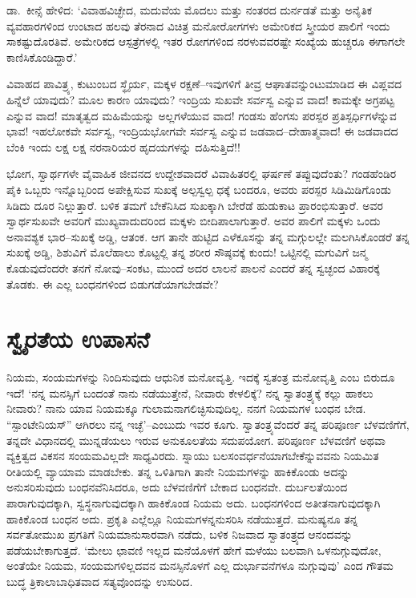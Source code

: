 ಡಾ.\ ಕೀನ್ಸೆ ಹೇಳಿದ: ‘ವಿವಾಹವಿಚ್ಛೇದ, ಮದುವೆಯ ಮೊದಲು ಮತ್ತು ನಂತರದ ದುರ್ನಡತೆ ಮತ್ತು ಅನೈತಿಕ ವ್ಯವಹಾರಗಳಿಂದ ಉಂಟಾದ ಹಲವು ತೆರನಾದ ವಿಚಿತ್ರ ಮನೋರೋಗಗಳು ಅಮೇರಿಕದ ಸ್ತ್ರೀಯರ ಪಾಲಿಗೆ ಇಂದು ಸಾಕಷ್ಟುದೊರತಿವೆ. ಅಮೇರಿಕದ ಆಸ್ಪತ್ರೆಗಳಲ್ಲಿ ಇತರ ರೋಗಗಳಿಂದ ನರಳುವವರಷ್ಟೇ ಸಂಖ್ಯೆಯ ಹುಚ್ಚರೂ ಈಗಾಗಲೇ ಕಾಣಿಸಿಕೊಂಡಿದ್ದಾರೆ.’

ವಿವಾಹದ ಪಾವಿತ್ರ್ಯ, ಕುಟುಂಬದ ಸ್ಥೈರ್ಯ, ಮಕ್ಕಳ ರಕ್ಷಣೆ–ಇವುಗಳಿಗೆ ತೀವ್ರ ಆಘಾತ\-ವನ್ನುಂಟು\-ಮಾಡಿದ ಈ ವಿಪ್ಲವದ ಹಿನ್ನೆಲೆ ಯಾವುದು? ಮೂಲ ಕಾರಣ ಯಾವುದು? ಇಂದ್ರಿಯ ಸುಖವೇ ಸರ್ವಸ್ವ ಎನ್ನುವ ವಾದ! ಕಾಮಕ್ಕೇ ಅಗ್ರಪಟ್ಟ ಎನ್ನುವ ವಾದ! ಮಾತೃತ್ವದ ಮಹಿಮೆಯನ್ನು ಅಲ್ಲಗಳೆಯುವ ವಾದ! ಗಂಡಸು ಹೆಂಗಸು ಪರಸ್ಪರ ಪ್ರತಿಸ್ಪರ್ಧಿಗಳೆನ್ನುವ ಭಾವ! ಇಹಲೋಕವೇ ಸರ್ವಸ್ವ, ಇಂದ್ರಿಯಭೋಗವೇ ಸರ್ವಸ್ವ ಎನ್ನುವ ಜಡವಾದ–ದೇಹಾತ್ಮವಾದ! ಈ ಜಡವಾದದ ಬೆಂಕಿ ಇಂದು ಲಕ್ಷ ಲಕ್ಷ ನರನಾರಿಯರ ಹೃದಯಗಳನ್ನು ದಹಿಸುತ್ತಿದೆ!!

ಭೋಗ, ಸ್ವಾರ್ಥಗಳೇ ವೈವಾಹಿಕ ಜೀವನದ ಉದ್ದೇಶವಾದರೆ ವಿವಾಹಿತರಲ್ಲಿ ಘರ್ಷಣೆ ತಪ್ಪುವುದೆಂತು? ಗಂಡಹೆಂಡಿರ ಪೈಕಿ ಒಬ್ಬರು ಇನ್ನೊಬ್ಬರಿಂದ ಅಪೇಕ್ಷಿಸುವ ಸುಖಕ್ಕೆ ಅಲ್ಪಸ್ವಲ್ಪ ಧಕ್ಕೆ ಬಂದರೂ, ಅವರು ಪರಸ್ಪರ ಸಿಡಿಮಿಡಿಗೊಂಡು ಸಿಡಿದು ದೂರ ನಿಲ್ಲುತ್ತಾರೆ. ಬಳಿಕ ತಮಗೆ ಬೇಕೆನಿಸಿದ ಸುಖಕ್ಕಾಗಿ ಬೇರೆಡೆ ಹುಡುಕಾಟ ಪ್ರಾರಂಭಿಸುತ್ತಾರೆ. ಅವರ ಸ್ವಾರ್ಥಸುಖವೇ ಅವರಿಗೆ ಮುಖ್ಯವಾದುದರಿಂದ ಮಕ್ಕಳು ಬೀದಿಪಾಲಾಗುತ್ತಾರೆ. ಅವರ ಪಾಲಿಗೆ ಮಕ್ಕಳು ಒಂದು ಅನಾವಶ್ಯಕ ಭಾರ–ಸುಖಕ್ಕೆ ಅಡ್ಡಿ, ಆತಂಕ. ಆಗ ತಾನೇ ಹುಟ್ಟಿದ ಎಳೆಕೂಸನ್ನು ತನ್ನ ಮಗ್ಗುಲಲ್ಲೇ ಮಲಗಿಸಿಕೊಂಡರೆ ತನ್ನ ಸುಖಕ್ಕೆ ಅಡ್ಡಿ, ಶಿಶುವಿಗೆ ಮೊಲೆಹಾಲು ಕೊಟ್ಟಲ್ಲಿ ತನ್ನ ಶರೀರ ಸೌಷ್ಠವಕ್ಕೆ ಕುಂದು! ಒಟ್ಟಿನಲ್ಲಿ ಮಗುವಿಗೆ ಜನ್ಮ ಕೊಡುವುದೆಂದರೇ ತನಗೆ ನೋವು–ಸಂಕಟ, ಮುಂದೆ ಅದರ ಲಾಲನೆ ಪಾಲನೆ ಎಂದರೆ ತನ್ನ ಸ್ವಚ್ಛಂದ ವಿಹಾರಕ್ಕೆ ತೊಡಕು. ಈ ಎಲ್ಲ ಬಂಧನಗಳಿಂದ ಬಿಡುಗಡೆಯಾಗಬೇಡವೇ?


\section*{ಸ್ವೈರತೆಯ ಉಪಾಸನೆ}


ನಿಯಮ, ಸಂಯಮಗಳನ್ನು ನಿಂದಿಸುವುದು ಆಧುನಿಕ ಮನೋ\-ವೃತ್ತಿ. ಇದಕ್ಕೆ ಸ್ವತಂತ್ರ ಮನೋ\-ವೃತ್ತಿ ಎಂಬ ಬಿರುದೂ ಇದೆ! ‘ನನ್ನ ಮನಸ್ಸಿಗೆ ಬಂದಂತೆ ನಾನು ನಡೆಯುತ್ತೇನೆ, ನೀವಾರು ಕೇಳಲಿಕ್ಕೆ? ನನ್ನ ಸ್ವಾತಂತ್ರ್ಯಕ್ಕೆ ಕಲ್ಲು ಹಾಕಲು ನೀವಾರು? ನಾನು ಯಾವ ನಿಯಮಕ್ಕೂ ಗುಲಾಮನಾಗಲಿಚ್ಛಿಸುವುದಿಲ್ಲ. ನನಗೆ ನಿಯಮಗಳ ಬಂಧನ ಬೇಡ. “ಸ್ಪಾಂಟೇನಿಯಸ್​” ಆಗಿರಲು ನನ್ನ ಇಚ್ಛೆ’–ಎಂಬುದು ಇವರ ಕೂಗು. ಸ್ವಾತಂತ್ರ್ಯವೆಂದರೆ ತನ್ನ ಪರಿಪೂರ್ಣ ಬೆಳವಣಿಗೆಗೆ, ತನ್ನದೇ ವಿಧಾನದಲ್ಲಿ ಮುನ್ನಡೆಯಲು ಇರುವ ಅನುಕೂಲತೆಯ ಸದುಪಯೋಗ. ಪರಿಪೂರ್ಣ ಬೆಳವಣಿಗೆ ಅಥವಾ ವ್ಯಕ್ತಿತ್ವದ ವಿಕಸನ ಸಂಯಮವಿಲ್ಲದೇ ಸಾಧ್ಯವಿರದು. ಸ್ನಾಯು ಬಲ\-ಸಂವರ್ಧನೆ\-ಯಾಗ\-ಬೇಕೆನ್ನು\-ವವನು ನಿಯಮಿತ ರೀತಿಯಲ್ಲಿ ವ್ಯಾಯಾಮ ಮಾಡಬೇಕು. ತನ್ನ ಒಳಿತಿಗಾಗಿ ತಾನೇ ನಿಯಮಗಳನ್ನು ಹಾಕಿಕೊಂಡು ಅದನ್ನು ಅನುಸರಿಸುವುದು ಬಂಧನವೆನಿಸಿದರೂ, ಅದು ಬೆಳವಣಿಗೆಗೆ ಬೇಕಾದ ಬಂಧನವೇ. ದುರ್ಬಲತೆಯಿಂದ ಪಾರಾಗುವುದಕ್ಕಾಗಿ, ಸ್ವಸ್ಥನಾಗು\-ವುದ\-ಕ್ಕಾಗಿ ಹಾಕಿಕೊಂಡ ನಿಯಮ ಅದು. ಬಂಧನಗಳಿಂದ ಅತೀತನಾಗುವುದಕ್ಕಾಗಿ ಹಾಕಿಕೊಂಡ ಬಂಧನ ಅದು. ಪ್ರಕೃತಿ ಎಲ್ಲೆಲ್ಲೂ ನಿಯಮಗಳನ್ನನುಸರಿಸಿ ನಡೆಯುತ್ತದೆ. ಮನುಷ್ಯನೂ ತನ್ನ ಸರ್ವತೋಮುಖ ಪ್ರಗತಿಗೆ ನಿಯಮಾನುಸಾರವಾಗಿ ನಡೆದು, ಬಳಿಕ ನಿಜವಾದ ಸ್ವಾತಂತ್ರ್ಯದ ಆನಂದವನ್ನು ಪಡೆಯಬೇಕಾಗುತ್ತದೆ. ‘ಮೇಲು ಛಾವಣಿ ಇಲ್ಲದ ಮನೆಯೊಳಗೆ ಹೇಗೆ ಮಳೆಯು ಬಲವಾಗಿ ಒಳನುಗ್ಗುವುದೋ, ಅಂತೆಯೇ ನಿಯಮ, ಸಂಯಮಗಳಿಲ್ಲದವನ ಮನಸ್ಸಿನೊಳಗೆ ಎಲ್ಲ ದುರ್ಭಾವನೆಗಳೂ ನುಗ್ಗುವುವು’ ಎಂದ ಗೌತಮ ಬುದ್ಧ ತ್ರಿಕಾಲಾಬಾಧಿತವಾದ ಸತ್ಯವೊಂದನ್ನು ಉಸುರಿದ.

